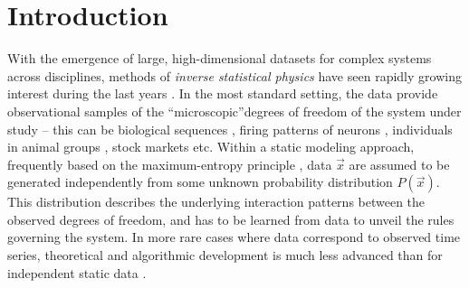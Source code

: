 \documentclass[preprint,amsmath,amssymb,superscriptaddress,showpacs,pre]{revtex4-1}
\begin{document}
\maketitle


\section{Introduction}
\label{sec:int}

With the emergence of large, high-dimensional datasets for complex systems across disciplines, methods of {\it inverse statistical physics} have seen rapidly growing interest during the last years \cite{Inverse_problem_Berg}. In the most standard setting, the data provide observational samples of the ``microscopic''degrees of freedom of the system under study -- this can be biological sequences \cite{levy_potts_2017,cocco_inverse_2018}, firing patterns of neurons \cite{schneidman2006weak,roudi2009ising}, individuals in animal groups \cite{bialek2012statistical,cavagna2018physics}, stock markets \cite{bury2013market,borysov2015us} etc.
Within a static modeling approach, frequently based on the maximum-entropy principle \cite{jaynes1957information}, data $\vec x$ are assumed to be generated independently from some unknown probability distribution $P(\vec x)$. This distribution describes the underlying interaction patterns between the observed degrees of freedom, and has to be learned from data to unveil the rules governing the system. 
In more rare cases where data correspond to observed time series, theoretical and algorithmic development is much less advanced than for independent static data \cite{Inverse_problem_Berg}.
\end{document}
